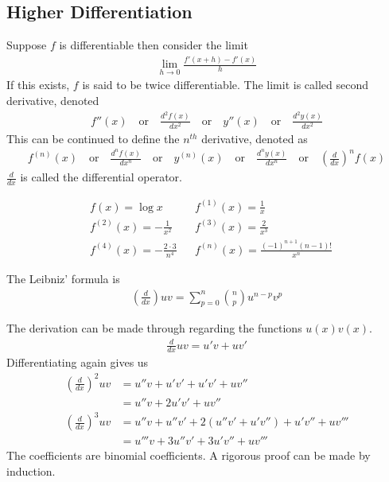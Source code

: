 \subsection{Higher Differentiation}
Suppose $f$ is differentiable then consider the limit
\begin{align*}
\lim_{h \to 0} \frac{f'(x+h) -f'(x)}{h}
\end{align*}
If this exists, $f$ is said to be twice differentiable. The limit is called second derivative, denoted 
\begin{align*}
f''(x) \quad \text{or} \quad \frac{d^2f(x)}{dx^2} \quad \text{or} \quad
y''(x) \quad \text{or} \quad \frac{d^2y(x)}{dx^2}
\end{align*}
This can be continued to define the $n^{th}$ derivative, denoted as
\begin{align*}
f^{(n)} (x) \quad \text{or} \quad \frac{d^n f(x)}{dx^n} \quad \text{or} \quad
y^{(n)}(x) \quad \text{or} \quad \frac{d^ny(x)}{dx^n} \quad \text{or} \quad \left( \frac d {dx} \right) ^n f(x)
\end{align*}
$\frac d {dx}$ is called the differential operator.


\begin{ex}
\begin{align*}
& f(x) = \log x & & f^{(1)}(x) = \frac 1 x \\
& f^{(2)} (x) = -\frac 1 {x^2} & & f^{(3)}(x) = \frac 2 {x^3} \\
& f^{(4)} (x) = -\frac{2 \cdot 3}{n^4} & & f^{(n)} (x) = \frac{(-1)^{n+1} (n-1)!}{x^n}
\end{align*}
\end{ex}

\begin{tm}
The Leibniz' formula is
\begin{align*}
\left(\frac d {dx} \right) u v = \sum_{p=0}^n \binom n p u^{n-p} v^p
\end{align*}
\end{tm}
The derivation can be made through regarding the functions $u(x)v(x)$.
\begin{align*}
\frac d {dx} u v = u'v + uv'
\end{align*}
Differentiating again gives us
\begin{align*}
\left( \frac d {dx} \right)^2 uv & = u'' v + u'v' + u'v' + uv'' \\
& = u''v + 2u'v' + u v'' \\
\left( \frac d {dx} \right)^3 uv & = u''v + u''v' + 2(u''v'+ u'v'') + u'v'' + uv''' \\
& = u'''v + 3u''v' + 3u'v'' + uv'''
\end{align*}
The coefficients are binomial coefficients. A rigorous proof can be made by induction.



